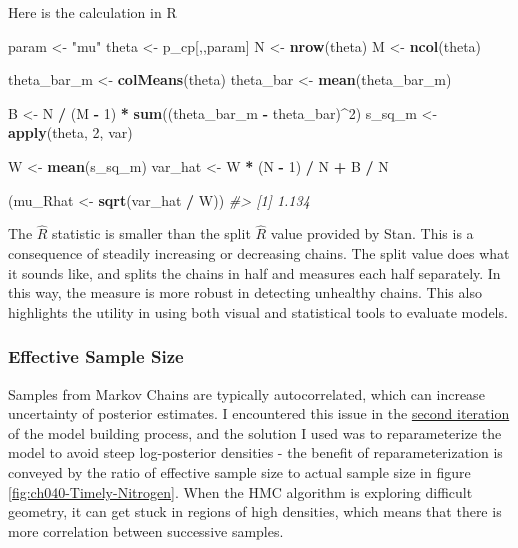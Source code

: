 \documentclass[11pt, oneside, openany]{scrbook}
\newenvironment{Shaded}{\begin{snugshade}}{\end{snugshade}}
\newcommand{\CommentTok}[1]{\textcolor[rgb]{0.56,0.35,0.01}{\textit{#1}}}
\newcommand{\DecValTok}[1]{\textcolor[rgb]{0.00,0.00,0.81}{#1}}
\newcommand{\KeywordTok}[1]{\textcolor[rgb]{0.13,0.29,0.53}{\textbf{#1}}}
\newcommand{\NormalTok}[1]{#1}
\newcommand{\OperatorTok}[1]{\textcolor[rgb]{0.81,0.36,0.00}{\textbf{#1}}}
\newcommand{\StringTok}[1]{\textcolor[rgb]{0.31,0.60,0.02}{#1}}
\begin{document}
Here is the calculation in R

\begin{Shaded}
\begin{Highlighting}[]
\NormalTok{param <-}\StringTok{ "mu"}
\NormalTok{theta <-}\StringTok{ }\NormalTok{p_cp[,,param]}
\NormalTok{N     <-}\StringTok{ }\KeywordTok{nrow}\NormalTok{(theta)}
\NormalTok{M     <-}\StringTok{ }\KeywordTok{ncol}\NormalTok{(theta)}

\NormalTok{theta_bar_m <-}\StringTok{ }\KeywordTok{colMeans}\NormalTok{(theta)}
\NormalTok{theta_bar   <-}\StringTok{ }\KeywordTok{mean}\NormalTok{(theta_bar_m)}

\NormalTok{B <-}\StringTok{ }\NormalTok{N }\OperatorTok{/}\StringTok{ }\NormalTok{(M }\OperatorTok{-}\StringTok{ }\DecValTok{1}\NormalTok{) }\OperatorTok{*}\StringTok{ }\KeywordTok{sum}\NormalTok{((theta_bar_m }\OperatorTok{-}\StringTok{ }\NormalTok{theta_bar)}\OperatorTok{^}\DecValTok{2}\NormalTok{)}
\NormalTok{s_sq_m <-}\StringTok{ }\KeywordTok{apply}\NormalTok{(theta, }\DecValTok{2}\NormalTok{, var)}

\NormalTok{W <-}\StringTok{ }\KeywordTok{mean}\NormalTok{(s_sq_m)}
\NormalTok{var_hat <-}\StringTok{ }\NormalTok{W }\OperatorTok{*}\StringTok{ }\NormalTok{(N }\OperatorTok{-}\StringTok{ }\DecValTok{1}\NormalTok{) }\OperatorTok{/}\StringTok{ }\NormalTok{N }\OperatorTok{+}\StringTok{ }\NormalTok{B }\OperatorTok{/}\StringTok{ }\NormalTok{N}

\NormalTok{(mu_Rhat <-}\StringTok{ }\KeywordTok{sqrt}\NormalTok{(var_hat }\OperatorTok{/}\StringTok{ }\NormalTok{W))}
\CommentTok{#> [1] 1.134}
\end{Highlighting}
\end{Shaded}

The \(\hat{R}\) statistic is smaller than the split \(\hat{R}\) value provided by Stan. This is a consequence of steadily increasing or decreasing chains. The split value does what it sounds like, and splits the chains in half and measures each half separately. In this way, the measure is more robust in detecting unhealthy chains. This also highlights the utility in using both visual and statistical tools to evaluate models.

\hypertarget{effective-sample-size}{%
\subsubsection{Effective Sample Size}\label{effective-sample-size}}

Samples from Markov Chains are typically autocorrelated, which can increase uncertainty of posterior estimates. I encountered this issue in the \protect\hyperlink{iter2}{second iteration} of the model building process, and the solution I used was to reparameterize the model to avoid steep log-posterior densities - the benefit of reparameterization is conveyed by the ratio of effective sample size to actual sample size in figure \ref{fig:ch040-Timely-Nitrogen}. When the HMC algorithm is exploring difficult geometry, it can get stuck in regions of high densities, which means that there is more correlation between successive samples.
\end{document}
